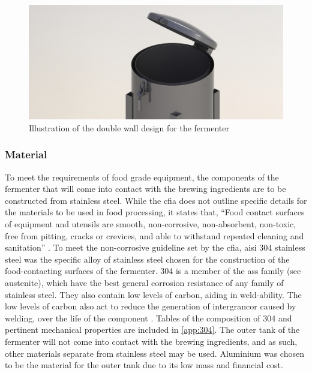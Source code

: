 \documentclass{article}
\begin{document}
\begin{figure}[H]
\begin{center}
\includegraphics[scale=0.25]{fermenter-wall-cad.png}
\caption{Illustration of the double wall design for the fermenter}
\label{fig:fermenter-wall-cad}
\end{center}
\end{figure}

\subsubsection{Material}
To meet the requirements of food grade equipment, the components of the fermenter that will come into contact with the brewing ingredients are to be constructed from stainless steel.  While the \gls{cfia} does not outline specific details for the materials to be used in food processing, it states that, ``Food contact surfaces of equipment and utensils are smooth, non-corrosive, non-absorbent, non-toxic, free from pitting, cracks or crevices, and able to withstand repeated cleaning and sanitation'' \cite{food-grade}.
To meet the non-corrosive guideline set by the \gls{cfia}, \gls{aisi} 304 stainless steel was the specific alloy of stainless steel chosen for the construction of the food-contacting surfaces of the fermenter.  304 is a member of the \gls{ass} family (see \gls{austenite}), which have the best general corrosion resistance of any family of stainless steel.  They also contain low levels of carbon, aiding in weld-ability.  The low levels of carbon also act to reduce the generation of \gls{intergrancor} caused by welding, over the life of the component \cite{asme-eng}.  Tables of the composition of 304 and pertinent mechanical properties are included in \ref{app:304}. The outer tank of the fermenter will not come into contact with the brewing ingredients, and as such, other materials separate from stainless steel may be used.  Aluminium was chosen to be the material for the outer tank due to its low mass and financial cost.
\end{document}
